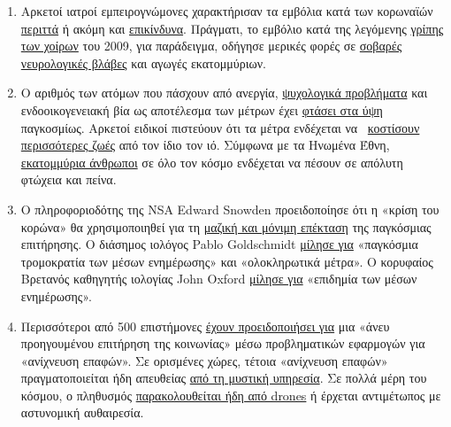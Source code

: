 \begin{enumerate}
\item
  Αρκετοί ιατροί εμπειρογνώμονες χαρακτήρισαν τα εμβόλια κατά των
  κορωναϊών \href{https://www.youtube.com/watch?v=vrL9QKGQrWk}{περιττά}
  ή ακόμη και
  \href{https://www.nature.com/articles/d41586-020-00751-9}{επικίνδυνα}.
  Πράγματι, το εμβόλιο κατά της λεγόμενης
  \href{https://www.forbes.com/2010/02/05/world-health-organization-swine-flu-pandemic-opinions-contributors-michael-fumento.html\#658c006c48e8}{γρίπης
  των χοίρων} του 2009, για παράδειγμα, οδήγησε μερικές φορές σε
  \href{https://www.ibtimes.co.uk/brain-damaged-uk-victims-swine-flu-vaccine-get-60-million-compensation-1438572}{σοβαρές
  νευρολογικές βλάβες} και αγωγές εκατομμύριων.
\item
  Ο αριθμός των ατόμων που πάσχουν από ανεργία,
  \href{https://www.indystar.com/story/news/health/2020/04/03/coronavirus-indiana-how-get-help-mental-health-addiction/5104357002/}{ψυχολογικά
  προβλήματα} και ενδοοικογενειακή βία ως αποτέλεσμα των μέτρων έχει
  \href{https://www.reuters.com/article/us-health-coronavirus-usa-layoffs/us-weekly-jobless-claims-seen-at-record-high-again-idUSKBN21K0FX}{φτάσει
  στα ύψη} παγκοσμίως. Αρκετοί ειδικοί πιστεύουν ότι τα μέτρα ενδέχεται
  να
  ~\href{https://www.nytimes.com/2020/03/20/opinion/coronavirus-pandemic-social-distancing.html}{κοστίσουν
  περισσότερες ζωές} από τον ίδιο τον ιό. Σύμφωνα με τα Ηνωμένα Έθνη,
  \href{https://www.theguardian.com/global-development/2020/apr/21/coronavirus-pandemic-will-cause-famine-of-biblical-proportions}{εκατομμύρια
  άνθρωποι} σε όλο τον κόσμο ενδέχεται να πέσουν σε απόλυτη φτώχεια και
  πείνα.
\item
  Ο πληροφοριοδότης της NSA Edward Snowden προειδοποίησε ότι η «κρίση
  του κορώνα» θα χρησιμοποιηθεί για τη
  \href{https://www.youtube.com/watch?v=-pcQFTzck_c}{μαζική και μόνιμη
  επέκταση} της παγκόσμιας επιτήρησης. Ο διάσημος ιολόγος Pablo
  Goldschmidt
  \href{https://www.rubikon.news/artikel/der-corona-totalitarismus}{μίλησε
  για} «παγκόσμια τρομοκρατία των μέσων ενημέρωσης» και «ολοκληρωτικά
  μέτρα». Ο κορυφαίος Βρετανός καθηγητής ιολογίας John Oxford
  \href{https://novuscomms.com/2020/03/31/a-view-from-the-hvivo-open-orphan-orph-laboratory-professor-john-oxford/}{μίλησε
  για} «επιδημία των μέσων ενημέρωσης».
\item
  Περισσότεροι από 500 επιστήμονες
  \href{https://www.esat.kuleuven.be/cosic/sites/contact-tracing-joint-statement/}{έχουν
  προειδοποιήσει για} μια «άνευ προηγουμένου επιτήρηση της κοινωνίας»
  μέσω προβληματικών εφαρμογών για «ανίχνευση επαφών». Σε ορισμένες
  χώρες, τέτοια «ανίχνευση επαφών» πραγματοποιείται ήδη απευθείας
  \href{https://www.jewishpress.com/news/the-courts/state-to-high-court-even-more-shin-bet-involvement-in-fighting-the-coronavirus/2020/04/14/}{από
  τη μυστική υπηρεσία}. Σε πολλά μέρη του κόσμου, ο πληθυσμός
  \href{https://off-guardian.org/2020/04/25/50-headlines-darker-more-of-the-new-normal/}{παρακολουθείται
  ήδη από drones} ή έρχεται αντιμέτωπος με αστυνομική αυθαιρεσία.
\end{enumerate}


